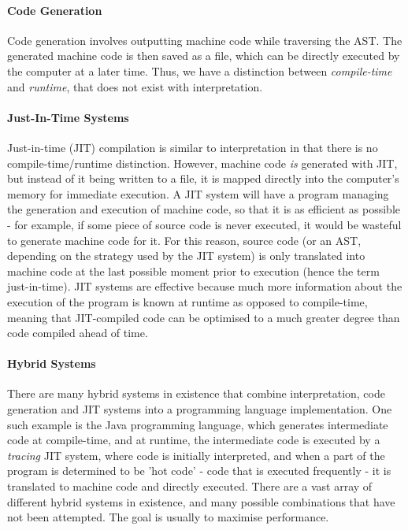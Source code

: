 \documentclass{article}
\begin{document}
\paragraph{Code Generation \\}
Code generation involves outputting machine code while traversing the AST. The generated machine code is then saved as a file, which can be directly executed by the computer at a later time. Thus, we have a distinction between \emph{compile-time} and \emph{runtime}, that does not exist with interpretation.

\paragraph{Just-In-Time Systems \\}
Just-in-time (JIT) compilation is similar to interpretation in that there is no compile-time/runtime distinction. However, machine code \emph{is} generated with JIT, but instead of it being written to a file, it is mapped directly into the computer's memory for immediate execution. A JIT system will have a program managing the generation and execution of machine code, so that it is as efficient as possible - for example, if some piece of source code is never executed, it would be wasteful to generate machine code for it. For this reason, source code (or an AST, depending on the strategy used by the JIT system) is only translated into machine code at the last possible moment prior to execution (hence the term just-in-time). JIT systems are effective because much more information about the execution of the program is known at runtime as opposed to compile-time, meaning that JIT-compiled code can be optimised to a much greater degree than code compiled ahead of time.

\paragraph{Hybrid Systems \\}
There are many hybrid systems in existence that combine interpretation, code generation and JIT systems into a programming language implementation. One such example is the Java programming language, which generates intermediate code at compile-time, and at runtime, the intermediate code is executed by a \emph{tracing} JIT system, where code is initially interpreted, and when a part of the program is determined to be 'hot code' - code that is executed frequently - it is translated to machine code and directly executed. There are a vast array of different hybrid systems in existence, and many possible combinations that have not been attempted. The goal is usually to maximise performance.
\end{document}
